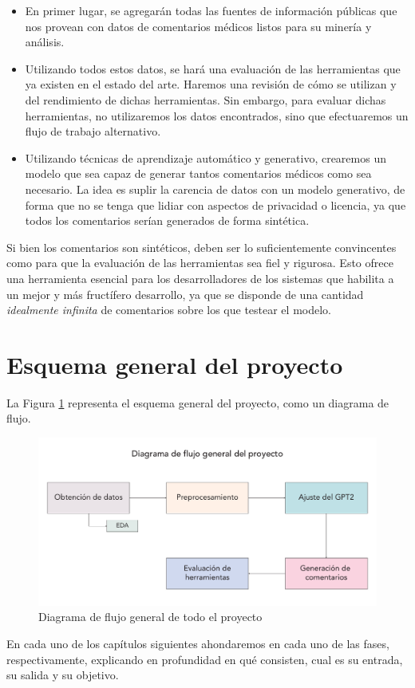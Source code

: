 \begin{itemize}
	\item En primer lugar, se agregarán todas las fuentes de información públicas que nos provean con datos de comentarios médicos listos para su minería y análisis.
	\item Utilizando todos estos datos, se hará una evaluación de las herramientas que ya existen en el estado del arte. Haremos una revisión de cómo se utilizan y del rendimiento de dichas herramientas. Sin embargo, para evaluar dichas herramientas, no utilizaremos los datos encontrados, sino que efectuaremos un flujo de trabajo alternativo. 
	\item Utilizando técnicas de aprendizaje automático y generativo, crearemos un modelo que sea capaz de generar tantos comentarios médicos como sea necesario. La idea es suplir la carencia de datos con un modelo generativo, de forma que no se tenga que lidiar con aspectos de privacidad o licencia, ya que todos los comentarios serían generados de forma sintética. 
\end{itemize}



Si bien los comentarios son sintéticos, deben ser lo suficientemente convincentes como para que la evaluación de las herramientas sea fiel y rigurosa. Esto ofrece una herramienta esencial para los desarrolladores de los sistemas que habilita a un mejor y más fructífero desarrollo, ya que se disponde de una cantidad \textit{idealmente infinita} de comentarios sobre los que testear el modelo.

\section{Esquema general del proyecto}

La Figura \ref{fig:general-diagram} representa el esquema general del proyecto, como un diagrama de flujo.
\begin{figure}[h]
	\centering
	\includegraphics[width=.9\textwidth]{media/general-diagram.pdf}
	\caption{Diagrama de flujo general de todo el proyecto}
	\label{fig:general-diagram}
\end{figure}

En cada uno de los capítulos siguientes ahondaremos en cada uno de las fases, respectivamente, explicando en profundidad en qué consisten, cual es su entrada, su salida y su objetivo.

